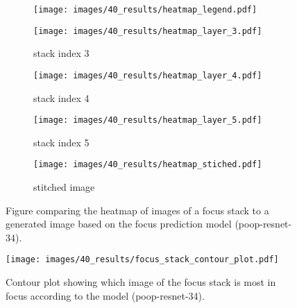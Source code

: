 \begin{figure}
    \centering
    \begin{subfigure}[b]{\textwidth}
        \centering
        \texttt{[image: images/40\_results/heatmap\_legend.pdf]}
    \end{subfigure}
    \begin{subfigure}[b]{0.5\textwidth}
        \centering
        \caption{stack index 3}
        \texttt{[image: images/40\_results/heatmap\_layer\_3.pdf]}
        \label{fig:Results:Stack:HeatMap:Stack3}
    \end{subfigure}%
    \begin{subfigure}[b]{0.5\textwidth}
        \centering
        \caption{stack index 4}
        \texttt{[image: images/40\_results/heatmap\_layer\_4.pdf]}
        \label{fig:Results:Stack:HeatMap:Stack4}
    \end{subfigure}
    \par
    \begin{subfigure}[b]{0.5\textwidth}
        \centering
        \caption{stack index 5}
        \texttt{[image: images/40\_results/heatmap\_layer\_5.pdf]}
        \label{fig:Results:Stack:HeatMap:Stack5}
    \end{subfigure}%
    \begin{subfigure}[b]{0.5\textwidth}
        \centering
        \caption{stitched image}
        \texttt{[image: images/40\_results/heatmap\_stiched.pdf]}
        \label{fig:Results:Stack:HeatMap:Stiched}
    \end{subfigure}
    \caption{Figure comparing the heatmap of images of a focus stack to a generated image based on the focus prediction model (\acs{poop}-\acs{resnet}-34).}
    \label{fig:Results:Stack:HeatMap}
\end{figure}

\begin{figure}
    \centering
    \texttt{[image: images/40\_results/focus\_stack\_contour\_plot.pdf]}
    \caption{Contour plot showing which image of the focus stack is most in focus according to the model (\acs{poop}-\acs{resnet}-34).}
    \label{fig:Results:Stack:ContourPlot}
\end{figure}

